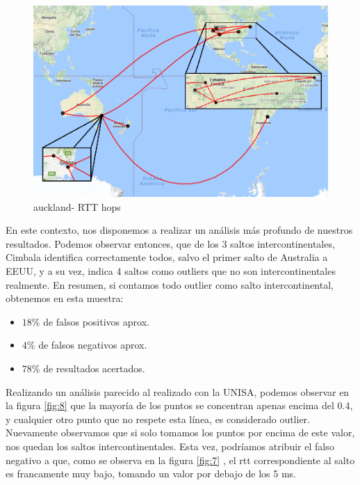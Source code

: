 \newpage

\begin{figure}[!htbp]
  \centering
    \includegraphics[scale=0.6]{imagenes/auckland-graficos/mapa-auckland.png}
  \caption{auckland- RTT hops}
  \label{mapa-auckland}
\end{figure}

En este contexto, nos disponemos a realizar un análisis más profundo de nuestros resultados. Podemos observar entonces, que de los 3 saltos intercontinentales, Cimbala identifica correctamente todos, salvo el primer salto de Australia a EEUU, y a su vez, indica 4 saltos como outliers que no son intercontinentales realmente. En resumen, si contamos todo outlier como salto intercontinental, obtenemos en esta muestra:

\begin{itemize}
	\item $18 \% $ de falsos positivos aprox.
	\item $4 \%$ de falsos negativos aprox.
	\item $78 \%$ de resultados acertados.
\end{itemize}

Realizando un análisis parecido al realizado con la UNISA, podemos observar en la figura \ref{fig:8} que la mayoría de los puntos se concentran apenas encima del 0.4, y cualquier otro punto que no respete esta línea, es considerado outlier. Nuevamente observamos que si solo tomamos los puntos por encima de este valor, nos quedan los saltos intercontinentales. Esta vez, podríamos atribuir el falso negativo a que, como se observa en la figura \ref{fig:7} , el rtt correspondiente al salto es francamente muy bajo, tomando un valor por debajo de los 5 ms.

